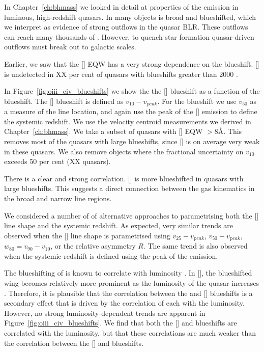 In Chapter~\ref{ch:bhmass} we looked in detail at properties of the  emission in luminous, high-redshift quasars. 
In many objects  is broad and blueshifted, which we interpret as evidence of strong outflows in the quasar BLR. 
These outflows can reach many thousands of \kms. 
However, to quench star formation quasar-driven outflows must break out to galactic scales. 

Earlier, we saw that the [] EQW has a very strong dependence on the  blueshift. 
[] is undetected in XX per cent of quasars with  blueshifts greater than 2000 \kms. 

In Figure~\ref{fig:oiii_civ_blueshifts} we show the the [] blueshift as a function of the  blueshift.
The [] blueshift is defined as $v_{10} - v_{\mathrm peak}$.
For the  blueshift we use $v_{50}$ as a measure of the line location, and again use the peak of the [] emission to define the systemic redshift. 
We use the  velocity centroid measurements we derived in Chapter~\ref{ch:bhmass}.
We take a subset of quasars with [] EQW $>8$\AA. 
This removes most of the quasars with large  blueshifts, since [] is on average very weak in these quasars. 
We also remove objects where the fractional uncertainty on $v_{10}$ exceeds 50 per cent (XX quasars). 

There is a clear and strong correlation.
[] is more blueshifted in quasars with large  blueshifts. 
This suggests a direct connection between the gas kinematics in the broad and narrow line regions. 

We considered a number of of alternative approaches to parametrising both the [] line shape and the systemic redshift. 
As expected, very similar trends are observed when the [] line shape is parametrised using $v_{25} - v_{\mathrm peak}$, $v_{50} - v_{\mathrm peak}$, $w_{80} = v_{90} - v_{10}$, or the relative asymmetry $R$.
The same trend is also observed when the systemic redshift is defined using the peak of the \hb emission. 

The blueshifting of  is known to correlate with luminosity \citep{richards11}.
In [], the blueshifted wing becomes relatively more prominent as the luminosity of the quasar increases \citep{shen14}. 
Therefore, it is plausible that the correlation between the  and [] blueshifts is a secondary effect that is driven by the correlation of each with the luminosity. 
However, no strong luminosity-dependent trends are apparent in Figure~\ref{fig:oiii_civ_blueshifts}. 
We find that both the [] and  blueshifts are correlated with the luminosity, but that these correlations are much weaker than the correlation between the [] and  blueshifts. 

